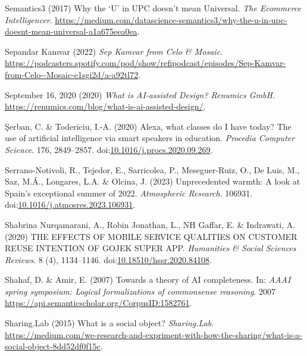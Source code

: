 \documentclass[
  letterpaper,
  DIV=11,
  numbers=noendperiod]{scrartcl}
\newlength{\cslhangindent}
\newenvironment{CSLReferences}[2] %
 {\begin{list}{}{%
  \setlength{\itemindent}{0pt}
  \setlength{\leftmargin}{0pt}
  \setlength{\parsep}{0pt}
  \ifodd #1
   \setlength{\leftmargin}{\cslhangindent}
   \setlength{\itemindent}{-1\cslhangindent}
  \fi
  \setlength{\itemsep}{#2\baselineskip}}}
 {\end{list}}
\begin{document}
\begin{CSLReferences}{0}{1}
Semantics3 (2017) Why the {`{U}'} in {UPC} doesn't mean {Universal}.
\emph{The Ecommerce Intelligencer}.
\url{https://medium.com/datascience-semantics3/why-the-u-in-upc-doesnt-mean-universal-a1a675eea0ea}.

Sepandar Kamvar (2022) \emph{Sep {Kamvar} from {Celo} \& {Mosaic}}.
\url{https://podcasters.spotify.com/pod/show/refipodcast/episodes/Sep-Kamvar-from-Celo--Mosaic-e1sgi2d/a-a92tl72}.

September 16, 2020 (2020) \emph{What is {AI-assisted Design}? {\textbar}
{Renumics GmbH}}.
\url{https://renumics.com/blog/what-is-ai-assisted-design/}.

Şerban, C. \& Todericiu, I.-A. (2020) Alexa, what classes do {I} have
today? {The} use of artificial intelligence via smart speakers in
education. \emph{Procedia Computer Science}. 176, 2849--2857.
doi:\href{https://doi.org/10.1016/j.procs.2020.09.269}{10.1016/j.procs.2020.09.269}.

Serrano-Notivoli, R., Tejedor, E., Sarricolea, P., Meseguer-Ruiz, O., De
Luis, M., Saz, M.Á., Longares, L.A. \& Olcina, J. (2023) Unprecedented
warmth: {A} look at {Spain}'s exceptional summer of 2022.
\emph{Atmospheric Research}. 106931.
doi:\href{https://doi.org/10.1016/j.atmosres.2023.106931}{10.1016/j.atmosres.2023.106931}.

Shabrina Nurqamarani, A., Robin Jonathan, L., NH Gaffar, E. \&
Indrawati, A. (2020) {THE EFFECTS OF MOBILE SERVICE QUALITIES ON
CUSTOMER REUSE INTENTION OF GOJEK SUPER APP}. \emph{Humanities \& Social
Sciences Reviews}. 8 (4), 1134--1146.
doi:\href{https://doi.org/10.18510/hssr.2020.84108}{10.18510/hssr.2020.84108}.

Shahaf, D. \& Amir, E. (2007) Towards a theory of {AI} completeness. In:
\emph{{AAAI} spring symposium: {Logical} formalizations of commonsense
reasoning}. 2007 \url{https://api.semanticscholar.org/CorpusID:1582761}.

Sharing.Lab (2015) What is a social object? \emph{Sharing.Lab}.
\url{https://medium.com/we-research-and-expriment-with-how-the-sharing/what-is-a-social-object-8dd52df0f15c}.


\end{CSLReferences}
\end{document}
